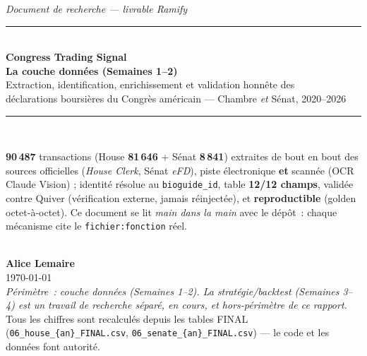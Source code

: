 \documentclass[11pt,a4paper]{article}
\newcommand{\co}[1]{\texttt{\small #1}}
\begin{document}
\begin{titlepage}
\centering
\vspace*{2.2cm}
{\small\itshape Document de recherche — livrable Ramify}\\[4pt]
\rule{\textwidth}{0.4pt}\\[10pt]
{\Huge\bfseries\color{coreC} Congress Trading Signal}\\[8pt]
{\LARGE\bfseries La couche données (Semaines 1--2)}\\[10pt]
{\large Extraction, identification, enrichissement et validation honnête des\\
déclarations boursières du Congrès américain — Chambre \emph{et} Sénat, 2020--2026}\\[8pt]
\rule{\textwidth}{0.4pt}\\[18pt]

\begin{minipage}{0.86\textwidth}\centering\small
\textbf{90\,487} transactions (House \textbf{81\,646} + Sénat \textbf{8\,841}) extraites de bout en
bout des sources officielles (\emph{House Clerk}, Sénat \emph{eFD}), piste électronique
\textbf{et} scannée (OCR Claude Vision) ; identité résolue au \texttt{bioguide\_id}, table
\textbf{12/12 champs}, validée contre Quiver (vérification externe, jamais réinjectée), et
\textbf{reproductible} (golden octet-à-octet). Ce document se lit \emph{main dans la main} avec le
dépôt~: chaque mécanisme cite le \co{fichier:fonction} réel.
\end{minipage}\\[26pt]

{\large\bfseries Alice Lemaire}\\[3pt]
{\small\today}\\[10pt]
{\footnotesize\itshape Périmètre~: couche données (Semaines 1--2). La stratégie/backtest (Semaines 3--4)
est un travail de recherche séparé, en cours, et hors-périmètre de ce rapport.}
\vfill
{\footnotesize Tous les chiffres sont recalculés depuis les tables FINAL
(\co{06_house_\{an\}_FINAL.csv}, \co{06_senate_\{an\}_FINAL.csv}) — le code et les données font autorité.}
\end{titlepage}

\end{document}
